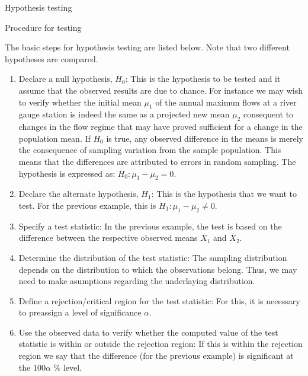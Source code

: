 \documentclass[8pt]{beamer}
\renewcommand{\emph}[1]{\textcolor{myorange}{#1}}
\begin{document}
\begin{frame}{Hypothesis testing}

    \begin{block}{Procedure for testing}
    \end{block}
    \vspace{-5pt}
    The basic steps for hypothesis testing are listed below. Note that two different \emph{hypotheses} are compared.
    \begin{enumerate}
        \item \alert{Declare a null hypothesis, $H_0$}:  This is the hypothesis to be tested and it assume that the observed results are due to chance. For instance we may wish to verify whether the initial mean $\mu_1$ of the annual maximun flows at a river gauge station is indeed the same as a projected new mean $\mu_2$ consequent to changes in the flow regime  that may have proved sufficient for a change in the population mean. If $H_0$ is true, any observed difference in the means is merely the consequence of sampling variation from the sample population. This means that the differences are attributed to errors in random sampling. The hypothesis is expressed as: $H_0: \mu_1 - \mu_2 = 0$.
        \item \alert{Declare the alternate hypothesis, $H_1$}: This is the hypothesis that we want to test. For the previous example, this is $H_1 : \mu_1 - \mu_2 \neq 0$.
        \item \alert{Specify a test statistic}: In the previous example, the test is based on the difference between the respective observed means $\bar{X}_1$ and $\bar{X}_2$. 
        \item \alert{Determine the distribution of the test statistic}: The sampling distribution depends on the distribution to which the observations belong. Thus, we may need to make asumptions regarding the underlaying distribution. 
        \item \alert{Define a rejection/critical region for the test statistic}: For this, it is necessary to preassign a level of significance $\alpha$. 
        \item \alert{Use the observed data to verify  whether the computed value of the test statistic is within or outside the rejection region}: If this is within the rejection region we say that the difference (for the previous example) is \emph{significant at the} $100\alpha$ \% level.  
    \end{enumerate}
\end{frame}
\end{document}
